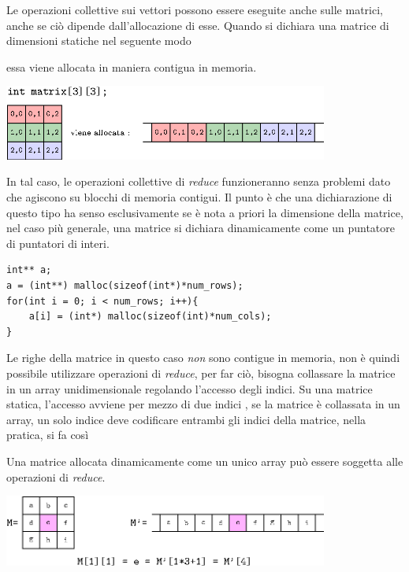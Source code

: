 \documentclass[10pt, letterpaper]{report}
\begin{document}
Le operazioni collettive sui vettori possono essere eseguite anche sulle matrici, anche se ciò dipende 
dall'allocazione di esse. Quando si dichiara una matrice di dimensioni 
statiche nel seguente modo \begin{quotation}
\end{quotation}
essa viene allocata in maniera contigua in memoria.
\begin{center}
    \includegraphics[width=0.8\textwidth]{images/matrixDeclaration.eps}
\end{center}
In tal caso, le operazioni collettive di \textit{reduce} funzioneranno senza problemi dato che 
agiscono su blocchi di memoria contigui. Il punto è che una dichiarazione di questo tipo ha senso 
esclusivamente se è nota a priori la dimensione della matrice, nel caso più generale, una matrice 
si dichiara dinamicamente come un puntatore di puntatori di interi.
\begin{lstlisting}[style=CStyle]
int** a;
a = (int**) malloc(sizeof(int*)*num_rows);
for(int i = 0; i < num_rows; i++){
    a[i] = (int*) malloc(sizeof(int)*num_cols);
}
\end{lstlisting}
Le righe della matrice in questo caso \textit{non} sono contigue in memoria, non è quindi possibile 
utilizzare operazioni di \textit{reduce}, per far ciò, bisogna collassare la matrice in un 
array unidimensionale regolando l'accesso degli indici. Su una matrice statica, l'accesso avviene 
per mezzo di due indici , se la matrice è collassata in un 
array, un solo indice deve codificare entrambi gli indici della matrice, nella pratica, si fa così\begin{quote}
\end{quote}
Una matrice allocata dinamicamente come un unico array può essere soggetta alle operazioni di \textit{reduce}.
\begin{center}
    \includegraphics[width=0.8\textwidth]{images/matrixDeclaration2.eps}
\end{center}
\end{document}
